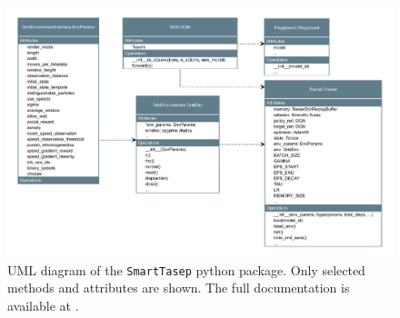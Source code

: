 \begin{figure}[h]
    \centering
    \includegraphics[width=\textwidth]{uml.pdf}
    \caption{UML diagram of the \texttt{SmartTasep} python package. Only selected methods and attributes are shown. The full documentation is available at \cite{maertens_smarttasep_github_2023}.}
    \label{fig:implementation}
\end{figure}


